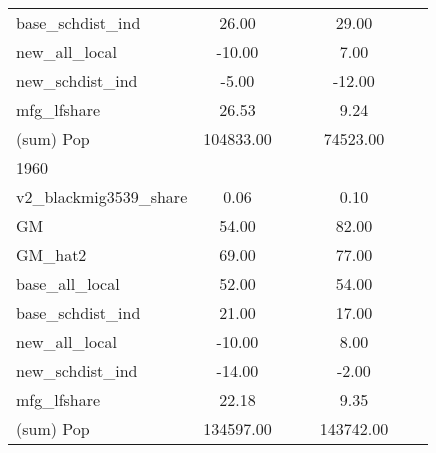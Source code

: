 \begin{table}[htbp]
\begin{tabular}{l*{2}{ccc}}
base\_schdist\_ind    &       26.00&            &            &       29.00&            &            \\
new\_all\_local       &      -10.00&            &            &        7.00&            &            \\
new\_schdist\_ind     &       -5.00&            &            &      -12.00&            &            \\
mfg\_lfshare         &       26.53&            &            &        9.24&            &            \\
(sum) Pop           &   104833.00&            &            &    74523.00&            &            \\
\midrule
1960                &            &            &            &            &            &            \\
v2\_blackmig3539\_share&        0.06&            &            &        0.10&            &            \\
GM                  &       54.00&            &            &       82.00&            &            \\
GM\_hat2             &       69.00&            &            &       77.00&            &            \\
base\_all\_local      &       52.00&            &            &       54.00&            &            \\
base\_schdist\_ind    &       21.00&            &            &       17.00&            &            \\
new\_all\_local       &      -10.00&            &            &        8.00&            &            \\
new\_schdist\_ind     &      -14.00&            &            &       -2.00&            &            \\
mfg\_lfshare         &       22.18&            &            &        9.35&            &            \\
(sum) Pop           &   134597.00&            &            &   143742.00&            &            \\
\bottomrule
\end{tabular}
\end{table}
